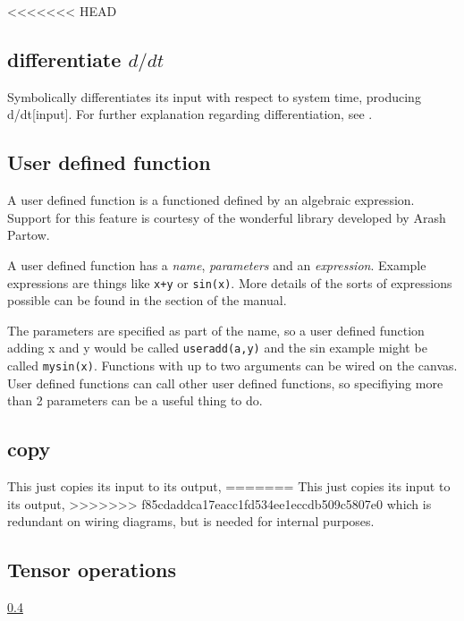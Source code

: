 <<<<<<< HEAD
\subsection{differentiate $d/dt$}\label{Operation:differentiate}
Symbolically differentiates its input with respect to system time,
producing d/dt[input].  For further explanation regarding
differentiation, see
.

\subsection{User defined
  function}\label{Operation:userFunction}\label{UserFunction}

A user defined function is a functioned defined by an algebraic
expression. Support for this feature is courtesy of the wonderful
library developed by Arash Partow.

A user defined function has a {\em name}, {\em parameters} and an {\em
  expression}. Example expressions are things like \verb'x+y' or
\verb'sin(x)'. More details of the sorts of expressions possible can
be found in the  section of
the manual.

The parameters are specified as part of the name, so a user defined
function adding x and y would be called \verb'useradd(a,y)' and the
sin example might be called \verb'mysin(x)'. Functions with up to two
arguments can be wired on the canvas. User defined functions can call
other user defined functions, so specifiying more than 2 parameters
can be a useful thing to do.

\subsection{copy}\label{Operation:copy} This just copies its input to its output,
=======
\label{Operation:copy} This just copies its input to its output,
>>>>>>> f85cdaddca17eacc1fd534ee1eccdb509c5807e0
which is redundant on wiring diagrams, but is needed for internal
purposes.

\subsection{Tensor operations}

\label{Operations: Reduction}\ref{Operations: Reduction}


